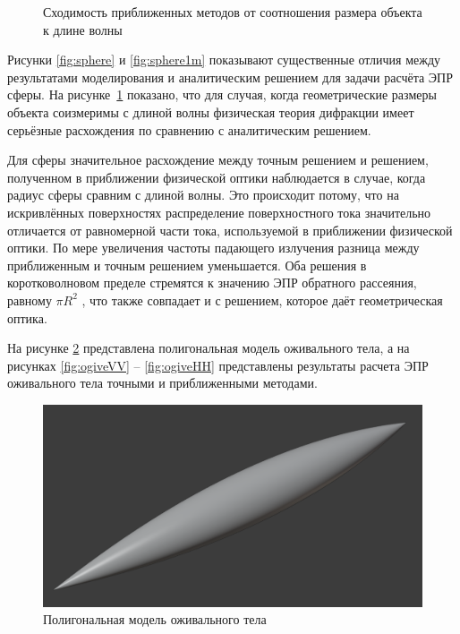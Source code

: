 \begin{figure}[h]
    \centering
    \noindent
    \caption{Сходимость приближенных методов от соотношения размера объекта к длине волны}
    \label{fig:sphere1mfreq}
\end{figure}

Рисунки \ref{fig:sphere} и \ref{fig:sphere1m} показывают существенные отличия между
результатами моделирования и аналитическим решением для задачи расчёта ЭПР сферы.
На рисунке~\ref{fig:sphere1mfreq} показано, что для случая, когда геометрические размеры
объекта соизмеримы с длиной волны
физическая теория дифракции имеет серьёзные расхождения по сравнению с аналитическим
решением.

Для сферы значительное расхождение между точным решением и решением, полученном в
приближении физической оптики наблюдается в случае, когда радиус сферы сравним с длиной
волны. Это происходит потому, что на искривлённых поверхностях распределение
поверхностного тока значительно отличается от равномерной части тока, используемой в
приближении физической оптики. По мере увеличения частоты падающего излучения разница
между приближенным и точным решением уменьшается. Оба решения в коротковолновом пределе
стремятся к значению ЭПР обратного рассеяния, равному $\pi R^2$ , что также совпадает и с
решением, которое даёт геометрическая оптика.


На рисунке \ref{fig:ogive} представлена полигональная модель оживального тела, а на
рисунках \ref{fig:ogiveVV} – \ref{fig:ogiveHH} представлены результаты расчета ЭПР
оживального тела точными и приближенными методами.

\begin{figure}
    \centering
    \includegraphics[width=0.5\linewidth]{Synopsis/images/Ogive}
    \caption{Полигональная модель оживального тела}
    \label{fig:ogive}
\end{figure}

